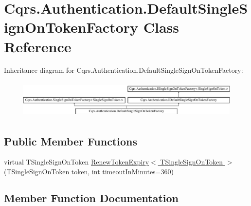 \hypertarget{classCqrs_1_1Authentication_1_1DefaultSingleSignOnTokenFactory}{}\section{Cqrs.\+Authentication.\+Default\+Single\+Sign\+On\+Token\+Factory Class Reference}
\label{classCqrs_1_1Authentication_1_1DefaultSingleSignOnTokenFactory}
Inheritance diagram for Cqrs.\+Authentication.\+Default\+Single\+Sign\+On\+Token\+Factory\+:\begin{figure}[H]
\begin{center}
\leavevmode
\includegraphics[height=1.967213cm]{classCqrs_1_1Authentication_1_1DefaultSingleSignOnTokenFactory}
\end{center}
\end{figure}
\subsection*{Public Member Functions}
\begin{DoxyCompactItemize}
\item 
virtual T\+Single\+Sign\+On\+Token \hyperlink{classCqrs_1_1Authentication_1_1DefaultSingleSignOnTokenFactory_a1bb480afd0a467461b0db59da641fe29_a1bb480afd0a467461b0db59da641fe29}{Renew\+Token\+Expiry$<$ T\+Single\+Sign\+On\+Token $>$} (T\+Single\+Sign\+On\+Token token, int timeout\+In\+Minutes=360)
\end{DoxyCompactItemize}


\subsection{Member Function Documentation}
\mbox{\label{classCqrs_1_1Authentication_1_1DefaultSingleSignOnTokenFactory_a1bb480afd0a467461b0db59da641fe29_a1bb480afd0a467461b0db59da641fe29}} 
